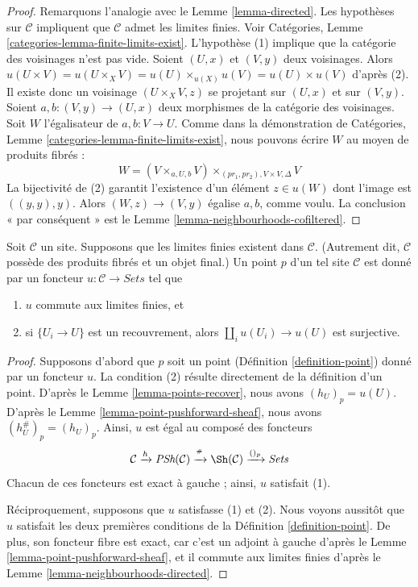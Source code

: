 \begin{proof}
Remarquons l’analogie avec le Lemme \ref{lemma-directed}.
Les hypothèses sur $\mathcal{C}$ impliquent que $\mathcal{C}$ admet les limites finies.
Voir Catégories, Lemme \ref{categories-lemma-finite-limits-exist}.
L’hypothèse (1) implique que la catégorie des voisinages
n’est pas vide. Soient $(U, x)$ et $(V, y)$ deux voisinages.
Alors
$u(U \times V) = u(U \times_X V) =
u(U) \times_{u(X)} u(V) = u(U) \times u(V)$ d’après (2).
Il existe donc un voisinage $(U \times_X V, z)$ se projetant
sur $(U, x)$ et sur $(V, y)$.
Soient $a, b : (V, y) \to (U, x)$ deux morphismes
de la catégorie des voisinages. Soit $W$ l’égalisateur de
$a, b : V \to U$. Comme dans la démonstration de
Catégories, Lemme \ref{categories-lemma-finite-limits-exist},
nous pouvons écrire $W$ au moyen de produits fibrés :
$$
W = (V \times_{a, U, b} V) \times_{(pr_1, pr_2), V \times V, \Delta} V
$$
La bijectivité de (2) garantit l’existence d’un élément $z \in u(W)$
dont l’image est $((y, y), y)$.
Alors $(W, z) \to (V, y)$ égalise $a, b$, comme voulu.
La conclusion « par conséquent » est le Lemme \ref{lemma-neighbourhoods-cofiltered}.
\end{proof}

\begin{proposition}
\label{proposition-point-limits}
Soit $\mathcal{C}$ un site. Supposons que les limites finies existent
dans $\mathcal{C}$. (Autrement dit, $\mathcal{C}$ possède des produits fibrés et un
objet final.) Un point $p$ d’un tel site $\mathcal{C}$
est donné par un foncteur $u : \mathcal{C} \to \textit{Sets}$ tel que
\begin{enumerate}
\item $u$ commute aux limites finies, et
\item si $\{U_i \to U\}$ est un recouvrement, alors
$\coprod_i u(U_i) \to u(U)$ est surjective.
\end{enumerate}
\end{proposition}

\begin{proof}
Supposons d’abord que $p$ soit un point (Définition \ref{definition-point})
donné par un foncteur $u$. La condition (2) résulte directement de
la définition d’un point. D’après le Lemme \ref{lemma-points-recover},
nous avons $(h_U)_p = u(U)$. D’après le Lemme \ref{lemma-point-pushforward-sheaf},
nous avons $(h_U^\#)_p = (h_U)_p$. Ainsi, $u$
est égal au composé des foncteurs
$$
\mathcal{C} \xrightarrow{h}
\textit{PSh}(\mathcal{C}) \xrightarrow{{}^\#}
\Sh(\mathcal{C}) \xrightarrow{()_p}
\textit{Sets}
$$
Chacun de ces foncteurs est exact à gauche ; ainsi, $u$ satisfait (1).

\medskip\noindent
Réciproquement, supposons que $u$ satisfasse (1) et (2).
Nous voyons aussitôt que $u$ satisfait les deux premières
conditions de la Définition \ref{definition-point}. De plus, son
foncteur fibre est exact, car c’est un adjoint à gauche d’après le
Lemme \ref{lemma-point-pushforward-sheaf}, et il commute
aux limites finies d’après le Lemme \ref{lemma-neighbourhoods-directed}.
\end{proof}

